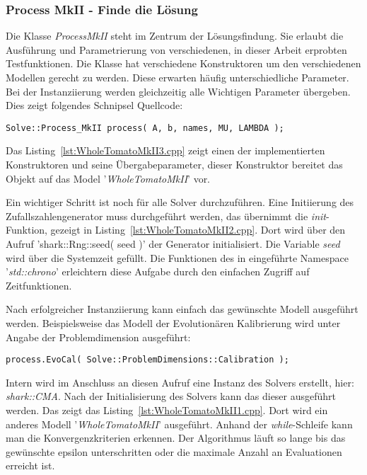 \subsubsection{Process MkII - Finde die Lösung}
%
Die Klasse \textit{ProcessMkII} steht im Zentrum der Lösungsfindung. Sie erlaubt die Ausführung und Parametrierung von verschiedenen, in dieser Arbeit erprobten Testfunktionen. Die Klasse hat verschiedene Konstruktoren um den verschiedenen Modellen gerecht zu werden. Diese erwarten häufig unterschiedliche Parameter. Bei der  Instanziierung werden gleichzeitig alle Wichtigen Parameter übergeben. Dies zeigt folgendes Schnipsel Quellcode:
%
\begin{lstlisting}[label=InstanceOfProcessMkII]
Solve::Process_MkII	process( A, b, names, MU, LAMBDA );
\end{lstlisting}
%
Das Listing~\ref{lst:WholeTomatoMkII3.cpp} zeigt einen der implementierten Konstruktoren und seine Übergabeparameter, dieser Konstruktor bereitet das Objekt auf das Model '\textit{WholeTomatoMkII}' vor.
%

%
Ein wichtiger Schritt ist noch für alle Solver durchzuführen. Eine Initiierung des Zufallszahlengenerator muss durchgeführt werden, das übernimmt die \textit{init}-Funktion, gezeigt in Listing~\ref{lst:WholeTomatoMkII2.cpp}. Dort wird über den Aufruf 'shark::Rng::seed( seed )' der Generator initialisiert. Die Variable \textit{seed} wird über die Systemzeit gefüllt. Die Funktionen des in  eingeführte Namespace '\textit{std::chrono}' erleichtern diese Aufgabe durch den einfachen Zugriff auf Zeitfunktionen.
%

%				
%
Nach erfolgreicher Instanziierung kann einfach das gewünschte Modell ausgeführt werden. Beispielsweise das Modell der Evolutionären Kalibrierung wird unter Angabe der Problemdimension ausgeführt:
%
\begin{lstlisting}[label=CallModel]
process.EvoCal( Solve::ProblemDimensions::Calibration );
\end{lstlisting}
%
Intern wird im Anschluss an diesen Aufruf eine Instanz des Solvers erstellt, hier: \textit{shark::CMA}. Nach der Initialisierung des Solvers kann das dieser ausgeführt werden. Das zeigt das Listing~\ref{lst:WholeTomatoMkII1.cpp}. Dort wird ein anderes Modell '\textit{WholeTomatoMkII}' ausgeführt. Anhand der \textit{while}-Schleife kann man die Konvergenzkriterien erkennen. Der Algorithmus läuft so lange bis das gewünschte epsilon unterschritten oder die maximale Anzahl an Evaluationen erreicht ist.
%
%

%
%
